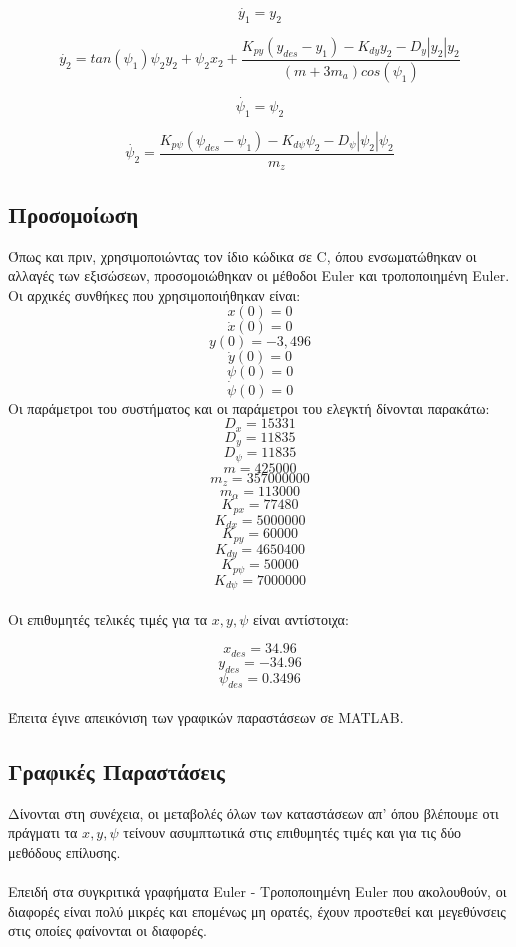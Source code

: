 \documentclass{article}
\begin{document}
\begin{equation}
\dot{y_1} = y_2
\end{equation}

\begin{equation}
\dot{y_2} = tan(\psi_1)\psi_2y_2 + \psi_2x_2 + \frac{K_{py}(y_{des} - y_1) - K_{dy}y_2 - D_y|y_2|y_2}{(m + 3m_a)cos(\psi_1)} 
\end{equation}

\begin{equation}
\dot{\psi_1} = \psi_2
\end{equation}

\begin{equation}
\dot{\psi_2} = \frac{K_{p\psi}(\psi_{des} - \psi_1) - K_{d\psi}\psi_2  - D_\psi|\psi_2|\psi_2}{m_z} 
\end{equation}

\subsection{Προσομοίωση}
Όπως και πριν, χρησιμοποιώντας τον ίδιο κώδικα σε C, όπου ενσωματώθηκαν οι αλλαγές των εξισώσεων, προσομοιώθηκαν οι μέθοδοι Euler και τροποποιημένη Euler. Oι αρχικές συνθήκες που χρησιμοποιήθηκαν είναι:
\[x(0) = 0\]
\[\dot{x}(0) = 0\]
\[y(0) = -3,496\]
\[\dot{y}(0) = 0\]
\[\psi(0) = 0\]
\[\dot{\psi}(0) = 0\]
Οι παράμετροι του συστήματος και οι παράμετροι του ελεγκτή δίνονται παρακάτω:
\[D_x = 15331\]
\[D_y = 11835\]
\[D_\psi = 11835\]
\[m = 425000\]
\[m_z = 357000000\]
\[m_\alpha = 113000\]
\[K_{px} = 77480\]
\[K_{dx} = 5000000\]
\[K_{py} = 60000\]
\[K_{dy} = 4650400\]
\[K_{p\psi} = 50000\]
\[K_{d\psi} = 7000000\]
\\
Οι επιθυμητές τελικές τιμές για τα \(x, y, \psi\) είναι αντίστοιχα: 

\[x_{des} = 34.96\]
\[y_{des} = -34.96\]
\[\psi_{des} = 0.3496\]
\\
Έπειτα έγινε απεικόνιση των γραφικών παραστάσεων σε MATLAB.

\subsection{Γραφικές Παραστάσεις}
Δίνονται στη συνέχεια, οι μεταβολές όλων των καταστάσεων απ' όπου βλέπουμε οτι πράγματι τα \(x, y, \psi\) τείνουν ασυμπτωτικά στις επιθυμητές τιμές και για τις δύο μεθόδους επίλυσης. 
\\\\
Επειδή στα συγκριτικά γραφήματα Euler - Τροποποιημένη Euler που ακολουθούν, οι διαφορές είναι πολύ μικρές και επομένως μη ορατές, έχουν προστεθεί και μεγεθύνσεις στις οποίες φαίνονται οι διαφορές. 
\end{document}
